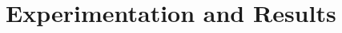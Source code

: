 \documentclass[sigconf]{acmart}
\begin{document}





\section{Experimentation and Results}\label{ch:res}
\end{document}
